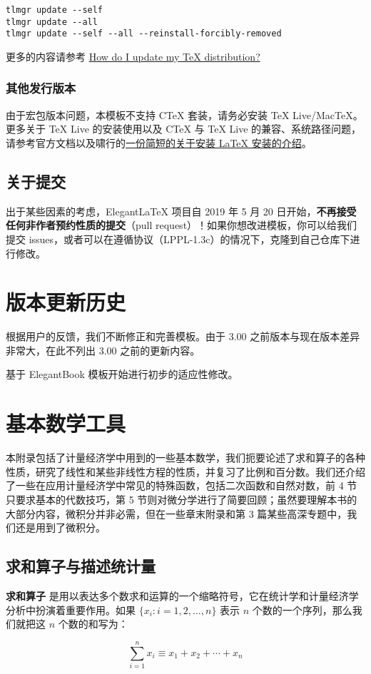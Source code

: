 \documentclass[lang=cn,10pt]{elegantbook}
\begin{document}
\begin{lstlisting}
tlmgr update --self 
tlmgr update --all
tlmgr update --self --all --reinstall-forcibly-removed
\end{lstlisting}

更多的内容请参考 \href{https://tex.stackexchange.com/questions/55437/how-do-i-update-my-tex-distribution}{How do I update my \TeX{} distribution?}

\subsection{其他发行版本}

由于宏包版本问题，本模板不支持 C\TeX{} 套装，请务必安装 TeX Live/Mac\TeX{}。更多关于 \TeX{} Live 的安装使用以及 C\TeX{} 与 \TeX{} Live 的兼容、系统路径问题，请参考官方文档以及啸行的\href{https://github.com/OsbertWang/install-latex-guide-zh-cn/releases/}{一份简短的关于安装 \LaTeX{} 安装的介绍}。


\section{关于提交}

出于某些因素的考虑，Elegant\LaTeX{} 项目自 2019 年 5 月 20 日开始，\textbf{不再接受任何非作者预约性质的提交}（pull request）！如果你想改进模板，你可以给我们提交 issues，或者可以在遵循协议（LPPL-1.3c）的情况下，克隆到自己仓库下进行修改。

\chapter{版本更新历史}

根据用户的反馈，我们不断修正和完善模板。由于 3.00 之前版本与现在版本差异非常大，在此不列出 3.00 之前的更新内容。



\begin{change}
  \item 基于 ElegantBook 模板开始进行初步的适应性修改。
\end{change}

\nocite{*}
\printbibliography[heading=bibintoc, title=\ebibname]
\appendix

\chapter{基本数学工具}


本附录包括了计量经济学中用到的一些基本数学，我们扼要论述了求和算子的各种性质，研究了线性和某些非线性方程的性质，并复习了比例和百分数。我们还介绍了一些在应用计量经济学中常见的特殊函数，包括二次函数和自然对数，前 4 节只要求基本的代数技巧，第 5 节则对微分学进行了简要回顾；虽然要理解本书的大部分内容，微积分并非必需，但在一些章末附录和第 3 篇某些高深专题中，我们还是用到了微积分。

\section{求和算子与描述统计量}

\textbf{求和算子} 是用以表达多个数求和运算的一个缩略符号，它在统计学和计量经济学分析中扮演着重要作用。如果 $\{x_i: i=1, 2, \ldots, n\}$ 表示 $n$ 个数的一个序列，那么我们就把这 $n$ 个数的和写为：

\begin{equation}
\sum_{i=1}^n x_i \equiv x_1 + x_2 +\cdots + x_n
\end{equation}
\end{document}
